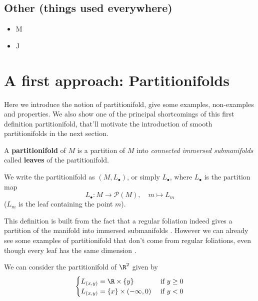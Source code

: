 	\subsection{Other (things used everywhere)}
        


		\begin{itemize}
			\item M
			\item J
		\end{itemize}


\section{A first approach: Partitionifolds}

	Here we introduce the notion of partitionifold, give some examples, non-examples and properties. We also show {\color{Red}one of the principal shortcomings} of this first definition partitionifold, that'll motivate the introduction of smooth partitionifolds in the next section.

	\begin{definition}
		A \textbf{partitionifold} of $M$ is a partition of $M$ into \emph{connected immersed submanifolds} called \textbf{leaves} of the partitionifold.

		We write the partitionifold as $(M, L_\bullet)$, or simply $L_\bullet$, where $L_\bullet$ is the partition map
		$$
			L_\bullet : M \to \mathcal{P}(M), \quad m \mapsto L_m
		$$
		($L_m$ is the leaf containing the point $m$).

	\end{definition}

	This definition is built from the fact that a regular foliation indeed gives a partition of the manifold into immersed submanifolds . However we can already see some examples of partitionifold that don't come from regular foliations, even though every leaf has the same dimension .

	\begin{example}[``T'' partitionifold]
		We can consider the partitionifold of $\R^2$ given by
		$$
		\begin{cases}
			L_{(x,y)} = \R \times \{y\}            &\text{ if } y \geq 0 \\
			L_{(x,y)} = \{x\} \times (-\infty, 0)  &\text{ if } y < 0
		\end{cases}
		$$

	\end{example}

